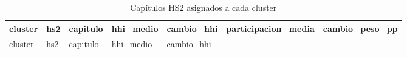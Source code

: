 \documentclass[
]{article}
\begin{document}
\begin{longtable}[]{@{}
  >{\raggedright\arraybackslash}p{}
  >{\raggedright\arraybackslash}p{}
  >{\raggedright\arraybackslash}p{}
  >{\raggedleft\arraybackslash}p{}
  >{\raggedleft\arraybackslash}p{}
  >{\raggedleft\arraybackslash}p{}
  >{\raggedleft\arraybackslash}p{}@{}}
\caption{Capítulos HS2 asignados a cada cluster}\tabularnewline
\toprule\noalign{}
\begin{minipage}[b]{\linewidth}\raggedright
cluster
\end{minipage} & \begin{minipage}[b]{\linewidth}\raggedright
hs2
\end{minipage} & \begin{minipage}[b]{\linewidth}\raggedright
capitulo
\end{minipage} & \begin{minipage}[b]{\linewidth}\raggedleft
hhi\_medio
\end{minipage} & \begin{minipage}[b]{\linewidth}\raggedleft
cambio\_hhi
\end{minipage} & \begin{minipage}[b]{\linewidth}\raggedleft
participacion\_media
\end{minipage} & \begin{minipage}[b]{\linewidth}\raggedleft
cambio\_peso\_pp
\end{minipage} \\
\midrule\noalign{}
\endfirsthead
\toprule\noalign{}
\begin{minipage}[b]{\linewidth}\raggedright
cluster
\end{minipage} & \begin{minipage}[b]{\linewidth}\raggedright
hs2
\end{minipage} & \begin{minipage}[b]{\linewidth}\raggedright
capitulo
\end{minipage} & \begin{minipage}[b]{\linewidth}\raggedleft
hhi\_medio
\end{minipage} & \begin{minipage}[b]{\linewidth}\raggedleft
cambio\_hhi
\end{minipage} & \begin{minipage}[b]{\linewidth}\raggedleft

\end{minipage}
\end{longtable}
\end{document}
